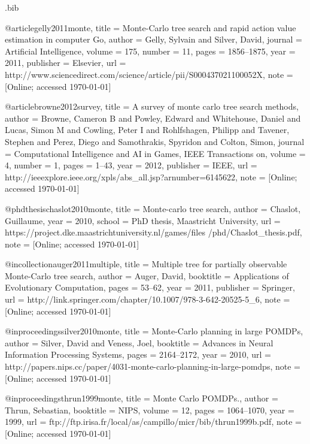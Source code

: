 \begin{filecontents*}{\jobname.bib}

@article{gelly2011monte,
	title		= {{M}onte-{C}arlo tree search and rapid action value estimation in computer {G}o},
	author	= {Gelly, Sylvain and Silver, David},
	journal	= {Artificial Intelligence},
	volume	= {175},
	number	= {11},
	pages		= {1856--1875},
	year		= {2011},
	publisher	= {Elsevier},
	url 		= {http://www.sciencedirect.com/science/article/pii/S000437021100052X},
	note		= {[Online; accessed \today]}
}

@article{browne2012survey,
	title 		= {{A} survey of monte carlo tree search methods},
	author 	= {Browne, Cameron B and Powley, Edward and Whitehouse, Daniel and Lucas, Simon M and Cowling, Peter I and Rohlfshagen, Philipp and Tavener, Stephen and Perez, Diego and Samothrakis, Spyridon and Colton, Simon},
	journal 	= {Computational Intelligence and AI in Games, IEEE Transactions on},
	volume 	= {4},
	number 	= {1},
	pages 	= {1--43},
	year 		= {2012},
	publisher 	= {IEEE},
	url 		= {http://ieeexplore.ieee.org/xpls/abs\_all.jsp?arnumber=6145622},
	note		= {[Online; accessed \today]}
}

@phdthesis{chaslot2010monte,
	title		= {Monte-carlo tree search},
	author	= {Chaslot, Guillaume},
	year		= {2010},
	school		= {PhD thesis, Maastricht University},
	url 		= {https://project.dke.maastrichtuniversity.nl/games/files /phd/Chaslot\_thesis.pdf},
	note		= {[Online; accessed \today]}
}

@incollection{auger2011multiple,
	title		= {{M}ultiple tree for partially observable {M}onte-{C}arlo tree search},
	author	= {Auger, David},
	booktitle	= {Applications of Evolutionary Computation},
	pages		= {53--62},
	year		= {2011},
	publisher	= {Springer},
	url 		= {http://link.springer.com/chapter/10.1007/978-3-642-20525-5\_6},
	note		= {[Online; accessed \today]}
}

@inproceedings{silver2010monte,
	title		= {{M}onte-{C}arlo planning in large {POMDP}s},
	author		= {Silver, David and Veness, Joel},
	booktitle	= {Advances in Neural Information Processing Systems},
	pages		= {2164--2172},
	year		= {2010},
	url 		= {http://papers.nips.cc/paper/4031-monte-carlo-planning-in-large-pomdps},
	note		= {[Online; accessed \today]}
}

@inproceedings{thrun1999monte,
	title		= {{M}onte {C}arlo {POMDP}s.},
	author	= {Thrun, Sebastian},
	booktitle	= {NIPS},
	volume	= {12},
	pages		= {1064--1070},
	year		= {1999},
	url 		= {ftp://ftp.irisa.fr/local/as/campillo/micr/bib/thrun1999b.pdf},
	note		= {[Online; accessed \today]}
}


\end{filecontents*}
